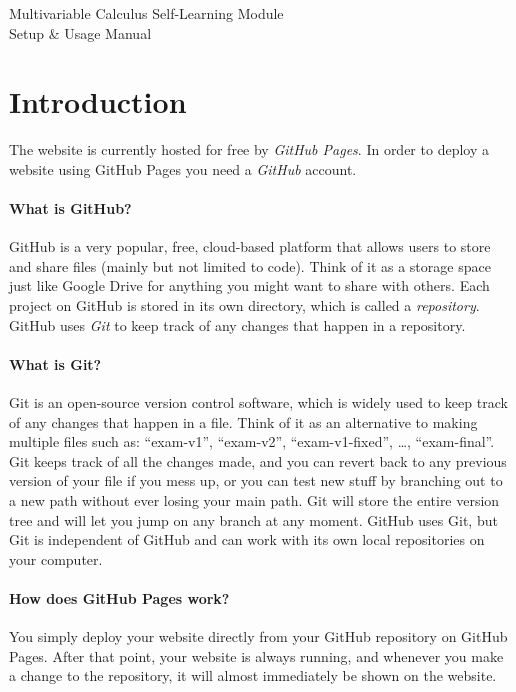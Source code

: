 \documentclass[a4paper,10pt]{article}
\begin{document}
\begingroup
\centering
\LARGE Multivariable Calculus Self-Learning Module\\[1em]
\large Setup \& Usage Manual\par
\vspace{32pt}
\endgroup

\tableofcontents

\clearpage

\section{Introduction}

The website is currently hosted for free by \emph{GitHub Pages}. In order to deploy a website using GitHub Pages you need a \emph{GitHub} account. 

\paragraph{What is GitHub?} GitHub is a very popular, free, cloud-based platform that allows users to store and share files (mainly but not limited to code). Think of it as a storage space just like Google Drive for anything you might want to share with others. Each project on GitHub is stored in its own directory, which is called a \emph{repository}. GitHub uses \emph{Git} to keep track of any changes that happen in a repository.

\paragraph{What is Git?} Git is an open-source version control software, which is widely used to keep track of any changes that happen in a file. Think of it as an alternative to making multiple files such as: ``exam-v1'', ``exam-v2'', ``exam-v1-fixed'', \dots, ``exam-final''. Git keeps track of all the changes made, and you can revert back to any previous version of your file if you mess up, or you can test new stuff by branching out to a new path without ever losing your main path. Git will store the entire version tree and will let you jump on any branch at any moment. GitHub uses Git, but Git is independent of GitHub and can work with its own local repositories on your computer.

\paragraph{How does GitHub Pages work?} You simply deploy your website directly from your GitHub repository on GitHub Pages. After that point, your website is always running, and whenever you make a change to the repository, it will almost immediately be shown on the website.
\end{document}
